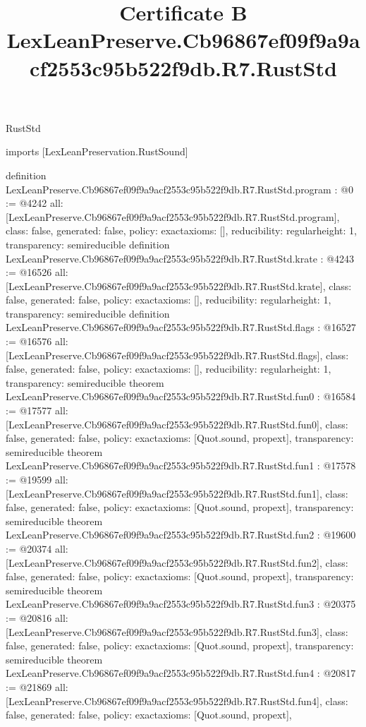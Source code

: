 \begin{lexlean}{RustStd}
\title{Certificate B LexLeanPreserve.Cb96867ef09f9a9acf2553c95b522f9db.R7.RustStd}
\begin{coremodule}
imports [LexLeanPreservation.RustSound]

definition LexLeanPreserve.Cb96867ef09f9a9acf2553c95b522f9db.R7.RustStd.program : @0 := @4242 {
  all: [LexLeanPreserve.Cb96867ef09f9a9acf2553c95b522f9db.R7.RustStd.program],
  class: false,
  generated: false,
  policy: exact{axioms: []},
  reducibility: regular{height: 1},
  transparency: semireducible
}
definition LexLeanPreserve.Cb96867ef09f9a9acf2553c95b522f9db.R7.RustStd.krate : @4243 := @16526 {
  all: [LexLeanPreserve.Cb96867ef09f9a9acf2553c95b522f9db.R7.RustStd.krate],
  class: false,
  generated: false,
  policy: exact{axioms: []},
  reducibility: regular{height: 1},
  transparency: semireducible
}
definition LexLeanPreserve.Cb96867ef09f9a9acf2553c95b522f9db.R7.RustStd.flags : @16527 := @16576 {
  all: [LexLeanPreserve.Cb96867ef09f9a9acf2553c95b522f9db.R7.RustStd.flags],
  class: false,
  generated: false,
  policy: exact{axioms: []},
  reducibility: regular{height: 1},
  transparency: semireducible
}
theorem LexLeanPreserve.Cb96867ef09f9a9acf2553c95b522f9db.R7.RustStd.fun0 : @16584 := @17577 {
  all: [LexLeanPreserve.Cb96867ef09f9a9acf2553c95b522f9db.R7.RustStd.fun0],
  class: false,
  generated: false,
  policy: exact{axioms: [Quot.sound, propext]},
  transparency: semireducible
}
theorem LexLeanPreserve.Cb96867ef09f9a9acf2553c95b522f9db.R7.RustStd.fun1 : @17578 := @19599 {
  all: [LexLeanPreserve.Cb96867ef09f9a9acf2553c95b522f9db.R7.RustStd.fun1],
  class: false,
  generated: false,
  policy: exact{axioms: [Quot.sound, propext]},
  transparency: semireducible
}
theorem LexLeanPreserve.Cb96867ef09f9a9acf2553c95b522f9db.R7.RustStd.fun2 : @19600 := @20374 {
  all: [LexLeanPreserve.Cb96867ef09f9a9acf2553c95b522f9db.R7.RustStd.fun2],
  class: false,
  generated: false,
  policy: exact{axioms: [Quot.sound, propext]},
  transparency: semireducible
}
theorem LexLeanPreserve.Cb96867ef09f9a9acf2553c95b522f9db.R7.RustStd.fun3 : @20375 := @20816 {
  all: [LexLeanPreserve.Cb96867ef09f9a9acf2553c95b522f9db.R7.RustStd.fun3],
  class: false,
  generated: false,
  policy: exact{axioms: [Quot.sound, propext]},
  transparency: semireducible
}
theorem LexLeanPreserve.Cb96867ef09f9a9acf2553c95b522f9db.R7.RustStd.fun4 : @20817 := @21869 {
  all: [LexLeanPreserve.Cb96867ef09f9a9acf2553c95b522f9db.R7.RustStd.fun4],
  class: false,
  generated: false,
  policy: exact{axioms: [Quot.sound, propext]},
}
\end{coremodule}
\end{lexlean}
